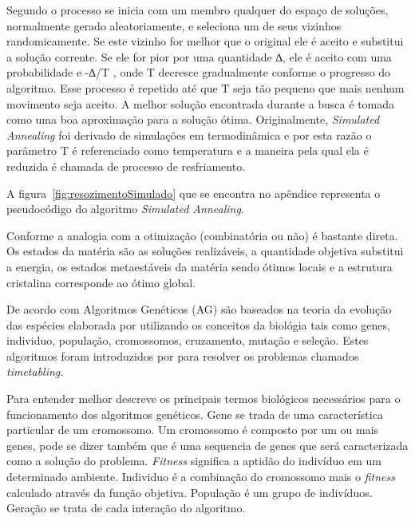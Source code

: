 \documentclass{abntpuc}
\begin{document}
Segundo \cite{souza2002experiencias} o processo se inicia com um membro qualquer do espaço de soluções, normalmente gerado aleatoriamente, e seleciona um de seus vizinhos randomicamente. Se este vizinho for melhor que o original ele é aceito e substitui a solução corrente. Se ele for pior por uma quantidade ∆, ele é aceito com uma probabilidade e -∆/T , onde T decresce gradualmente conforme o progresso do algoritmo. Esse processo é repetido até que T seja tão pequeno que mais nenhum movimento seja aceito. A melhor solução encontrada durante a busca é tomada como uma boa aproximação para a solução ótima. Originalmente, \textit{Simulated Annealing} foi derivado de simulações em termodinâmica e por esta razão o parâmetro T é referenciado como temperatura e a maneira pela qual ela é reduzida é chamada de processo de resfriamento.


A figura~\ref{fig:resozimentoSimulado} que se encontra no apêndice representa o pseudocódigo do algoritmo \textit{Simulated Annealing}.

Conforme \cite{aarts1988simulated} a analogia com a otimização (combinatória ou não) é bastante direta. Os estados da matéria são as soluções realizáveis, a quantidade objetiva substitui a energia, os estados metaestáveis da matéria sendo ótimos locais e a estrutura cristalina corresponde ao ótimo global.\par 


De acordo com \cite{goldberg1989genetic} Algoritmos Genéticos (AG) são baseados na teoria da evolução das espécies elaborada por \cite{darwin1968origin} utilizando os conceitos da biológia tais como genes, individuo, população, cromossomos, cruzamento, mutação e seleção. Estes algoritmos foram introduzidos por \cite{holland1975adaptation} para resolver os problemas chamados \textit{timetabling}.

Para entender melhor \cite{mitchell1998introduction} descreve os principais termos biológicos necessários para o funcionamento dos algoritmos genéticos. Gene se trada de uma característica particular de um cromossomo. Um cromossomo é composto por um ou mais genes, pode se dizer também que é uma sequencia de genes que será caracterizada como a solução do problema. \textit{Fitness} significa a aptidão do indivíduo em um determinado ambiente. Individuo é a combinação do cromossomo mais o \textit{fitness} calculado através da função objetiva. População é um grupo de indivíduos. Geração se trata de cada interação do algoritmo.\par
\end{document}
